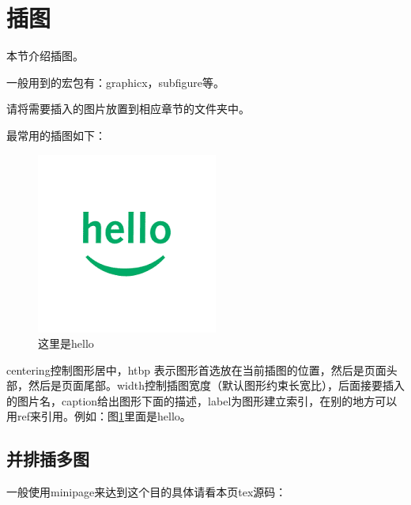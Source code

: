 \section{插图}
本节介绍插图。

一般用到的宏包有：graphicx，subfigure等。

请将需要插入的图片放置到相应章节的文件夹中。

最常用的插图如下：

\begin{figure}[htbp]
 \centering
        \includegraphics[width=0.5\columnwidth]{hello.png}
        \caption{
                \label{hello}
                这里是hello
        }
\end{figure}

centering控制图形居中，htbp 表示图形首选放在当前插图的位置，然后是页面头部，然后是页面尾部。width控制插图宽度（默认图形约束长宽比），后面接要插入的图片名，caption给出图形下面的描述，label为图形建立索引，在别的地方可以用ref来引用。例如：图\ref{hello}里面是hello。 

\subsection{并排插多图}

一般使用minipage来达到这个目的具体请看本页tex源码：

